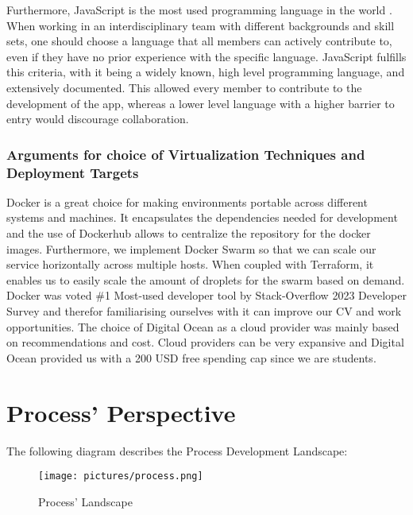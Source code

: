 \documentclass[11pt]{article}
\begin{document}
Furthermore, JavaScript is the most used programming language in the world \citep{javascript_good}. When working in an interdisciplinary team with different backgrounds and skill sets, one should choose a language that all members can actively contribute to, even if they have no prior experience with the specific language. JavaScript fulfills this criteria, with it being a widely known, high level programming language, and extensively documented. This allowed every member to contribute to the development of the app, whereas a lower level language with a higher barrier to entry would discourage collaboration. 


\subsubsection{Arguments for choice of Virtualization Techniques and Deployment Targets}
Docker is a great choice for making environments portable across different systems and machines. It encapsulates the dependencies needed for development and the use of Dockerhub allows to centralize the repository for the docker images. Furthermore, we implement Docker Swarm so that we can scale our service horizontally across multiple hosts. When coupled with Terraform, it enables us to easily scale the amount of droplets for the swarm based on demand. Docker was voted \#1 Most-used developer tool by Stack-Overflow 2023 Developer Survey \citep{docker_no1} and therefor familiarising ourselves with it can improve our CV and work opportunities.
The choice of Digital Ocean as a cloud provider was mainly based on recommendations and cost. Cloud providers can be very expansive and Digital Ocean provided us with a 200 USD free spending cap since we are students.

\section{Process' Perspective}
The following diagram describes the Process Development Landscape:
\begin{figure}[!h]
    \centering
    \texttt{[image: pictures/process.png]}
    \caption{Process' Landscape}
    \label{fig:process-overview}
\end{figure}
\end{document}
